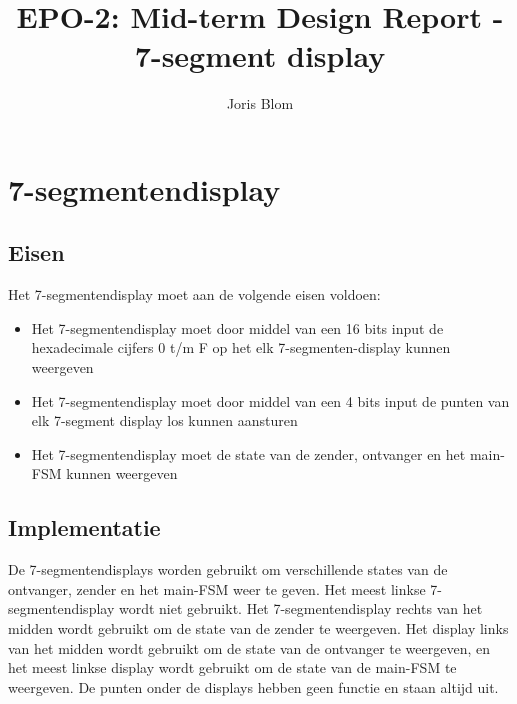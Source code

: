 \documentclass{report}
\title{EPO-2: Mid-term Design Report - 7-segment display}
\author{Joris Blom}
\begin{document}
\chapter{7-segmentendisplay}
\label{ch:sseg}
\section{Eisen}
\label{sec:Eisen}
Het 7-segmentendisplay moet aan de volgende eisen voldoen: 
\begin{itemize}
\item Het 7-segmentendisplay moet door middel van een 16 bits input de hexadecimale cijfers 0 t/m F op het elk 7-segmenten-display kunnen weergeven
\item Het 7-segmentendisplay moet door middel van een 4 bits input de punten van elk 7-segment display los kunnen aansturen
\item Het 7-segmentendisplay moet de state van de zender, ontvanger en het main-FSM kunnen weergeven
\end{itemize}

\section{Implementatie}
De 7-segmentendisplays worden gebruikt om verschillende states van de ontvanger, zender en het main-FSM weer te geven.
Het meest linkse 7-segmentendisplay wordt niet gebruikt.
Het 7-segmentendisplay rechts van het midden wordt gebruikt om de state van de zender te weergeven.
Het display links van het midden wordt gebruikt om de state van de ontvanger te weergeven, en het meest linkse display wordt gebruikt om de state van de main-FSM te weergeven.
De punten onder de displays hebben geen functie en staan altijd uit.
\newpage
\end{document}
